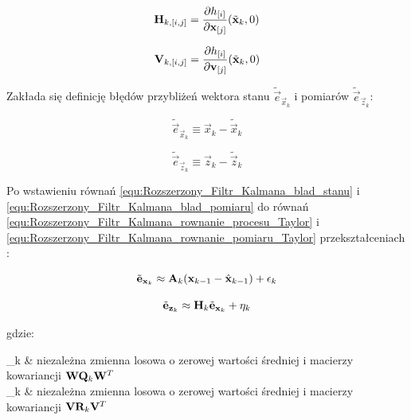 \begin{equation}
\label{equ:Rozszerzony_Filtr_Kalmana_macierz_H}
	\mathbf{H}_{k,[i,j]} = \frac{\partial h_{[i]}}{\partial \mathbf{x}_{[j]}} (\tilde{\mathbf{x}}_k, 0)
\end{equation}

\begin{equation}
\label{equ:Rozszerzony_Filtr_Kalmana_macierz_V}
	\mathbf{V}_{k,[i,j]} = \frac{\partial h_{[i]}}{\partial \mathbf{v}_{[j]}} (\tilde{\mathbf{x}}_k, 0)
\end{equation}

\noindent
Zakłada się definicję błędów przybliżeń wektora stanu $\tilde{\vec{e}}_{\vec{x}_k}$ i pomiarów $\tilde{\vec{e}}_{\vec{z}_k}$:

\begin{equation}
\label{equ:Rozszerzony_Filtr_Kalmana_blad_stanu}
	\tilde{\vec{e}}_{\vec{x}_k} \equiv \vec{x}_k - \tilde{\vec{x}}_k
\end{equation}

\begin{equation}
\label{equ:Rozszerzony_Filtr_Kalmana_blad_pomiaru}
	\tilde{\vec{e}}_{\vec{z}_k} \equiv \vec{z}_k - \tilde{\vec{z}}_k
\end{equation}

Po wstawieniu równań \ref{equ:Rozszerzony_Filtr_Kalmana_blad_stanu} i \ref{equ:Rozszerzony_Filtr_Kalmana_blad_pomiaru} do równań \ref{equ:Rozszerzony_Filtr_Kalmana_rownanie_procesu_Taylor} i \ref{equ:Rozszerzony_Filtr_Kalmana_rownanie_pomiaru_Taylor} przekształceniach \cite{Welch1995}:

\begin{equation}
\label{equ:Rozszerzony_Filtr_Kalmana_blad_stanu_cd}
	\tilde{\vec{e}}_{\vec{x}_k} \approx \matr{A}_k(\vec{x}_{k-1} - \hat{\vec{x}}_{k-1}) + \vec{\epsilon}_k
\end{equation}

\begin{equation}
\label{equ:Rozszerzony_Filtr_Kalmana_blad_pomiaru_cd}
	\tilde{\mathbf{e}}_{\mathbf{z}_k} \approx \mathbf{H}_k \tilde{\mathbf{e}}_{\mathbf{x}_k} + \mathbf{\eta}_k
\end{equation}

\noindent
gdzie:

\begin{conditions}
	\vec{\epsilon}_k & niezależna zmienna losowa o zerowej wartości średniej i macierzy kowariancji $\mathbf{W}\mathbf{Q}_k\mathbf{W}^T$ \\
	\vec{\eta}_k & niezależna zmienna losowa o zerowej wartości średniej i macierzy kowariancji $\mathbf{V}\mathbf{R}_k\mathbf{V}^T$ \\
\end{conditions}

